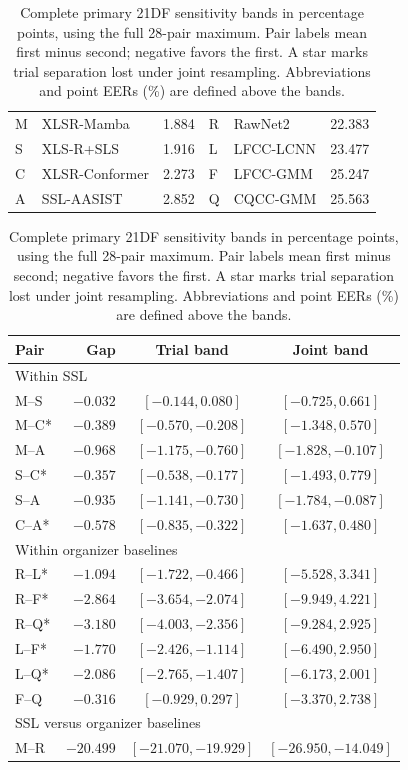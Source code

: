 \documentclass{article}
\renewcommand{\small}{\fontsize{9.1pt}{10.5pt}\selectfont}
\begin{document}
\begin{table}[t]
\caption{Complete primary 21DF sensitivity bands in percentage points, using the full 28-pair maximum. Pair labels mean first minus second; negative favors the first. A star marks trial separation lost under joint resampling. Abbreviations and point EERs (\%) are defined above the bands.}
\label{tab:eers}
\centering\small
\setlength{\tabcolsep}{2pt}
\begin{tabular}{@{}llrllr@{}}
\toprule
M & XLSR-Mamba & 1.884 & R & RawNet2 & 22.383 \\
S & XLS-R+SLS & 1.916 & L & LFCC-LCNN & 23.477 \\
C & XLSR-Conformer & 2.273 & F & LFCC-GMM & 25.247 \\
A & SSL-AASIST & 2.852 & Q & CQCC-GMM & 25.563 \\
\bottomrule
\end{tabular}
\smallskip
\begin{tabular}{@{}lrcc@{}}
\toprule
Pair & Gap & Trial band & Joint band \\
\midrule
\multicolumn{4}{l}{Within SSL} \\
M--S & $-0.032$ & $[-0.144,0.080]$ & $[-0.725,0.661]$ \\
M--C* & $-0.389$ & $[-0.570,-0.208]$ & $[-1.348,0.570]$ \\
M--A & $-0.968$ & $[-1.175,-0.760]$ & $[-1.828,-0.107]$ \\
S--C* & $-0.357$ & $[-0.538,-0.177]$ & $[-1.493,0.779]$ \\
S--A & $-0.935$ & $[-1.141,-0.730]$ & $[-1.784,-0.087]$ \\
C--A* & $-0.578$ & $[-0.835,-0.322]$ & $[-1.637,0.480]$ \\
\midrule
\multicolumn{4}{l}{Within organizer baselines} \\
R--L* & $-1.094$ & $[-1.722,-0.466]$ & $[-5.528,3.341]$ \\
R--F* & $-2.864$ & $[-3.654,-2.074]$ & $[-9.949,4.221]$ \\
R--Q* & $-3.180$ & $[-4.003,-2.356]$ & $[-9.284,2.925]$ \\
L--F* & $-1.770$ & $[-2.426,-1.114]$ & $[-6.490,2.950]$ \\
L--Q* & $-2.086$ & $[-2.765,-1.407]$ & $[-6.173,2.001]$ \\
F--Q & $-0.316$ & $[-0.929,0.297]$ & $[-3.370,2.738]$ \\
\midrule
\multicolumn{4}{l}{SSL versus organizer baselines} \\
M--R & $-20.499$ & $[-21.070,-19.929]$ & $[-26.950,-14.049]$ \\

\end{tabular}
\end{table}
\end{document}
